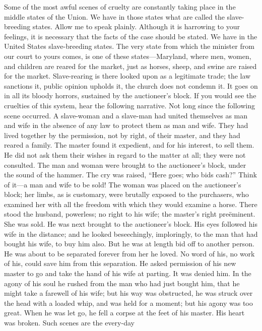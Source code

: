 Some of the most awful scenes of cruelty are constantly taking place in
the middle states of the Union. We have in those states what are called
the slave-breeding states. Allow me to speak plainly. Although it is
harrowing to your feelings, it is necessary {}that the facts of the case
should be stated. We have in the United States slave-breeding states.
The very state from which the minister from our court to yours comes, is
one of these states---Maryland, where men, women, and children are
reared for the market, just as horses, sheep, and swine are raised for
the market. Slave-rearing is there looked upon as a legitimate trade;
the law sanctions it, public opinion upholds it, the church does not
condemn it. It goes on in all its bloody horrors, sustained by the
auctioneer's block. If you would see the cruelties of this system, hear
the following narrative. Not long since the following scene occurred. A
slave-woman and a slave-man had united themselves as man and wife in the
absence of any law to protect them as man and wife. They had lived
together by the permission, not by right, of their master, and they had
reared a family. The master found it expedient, and for his interest, to
sell them. He did not ask them their wishes in regard to the matter at
all; they were not consulted. The man and woman were brought to the
auctioneer's block, under the sound of the hammer. The cry was raised,
``Here goes; who bids cash?'' Think of it---a man and wife to be sold!
The woman was placed on the auctioneer's block; her limbs, as is
customary, were brutally exposed to the purchasers, who examined her
with all the freedom with which they would examine a horse. There stood
the husband, powerless; no right to his wife; the master's right
preëminent. She was sold. He was next brought to the auctioneer's block.
His eyes followed his wife in the distance; and he looked beseechingly,
imploringly, to the man that had bought his wife, to buy him also. But
he was at length bid off to another person. He was about to be separated
forever from her he loved. No word of his, no work of his, could save
him from this separation. He asked permission of his new master to go
and take the hand of his wife at parting. It was denied him. In the
agony of his soul he rushed from the man who had just bought him, that
he might take a farewell of his wife; but his way was obstructed, he was
struck over the head with a loaded whip, and was held for a moment; but
his agony was too great. When he was let go, he fell a corpse at the
feet of his master. His heart was broken. Such scenes are the every-day
